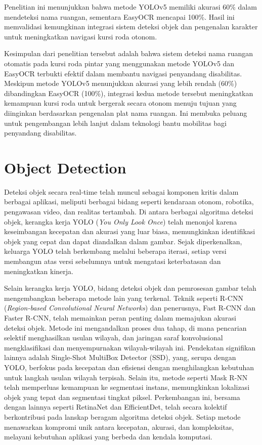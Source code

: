 Penelitian ini menunjukkan bahwa metode YOLOv5 memiliki akurasi 60\% dalam mendeteksi nama ruangan, sementara EasyOCR mencapai 100\%. Hasil ini memvalidasi kemungkinan integrasi sistem deteksi objek dan pengenalan karakter untuk meningkatkan navigasi kursi roda otonom.

Kesimpulan dari penelitian tersebut adalah bahwa sistem deteksi nama ruangan otomatis pada kursi roda pintar yang menggunakan metode YOLOv5 dan EasyOCR terbukti efektif dalam membantu navigasi penyandang disabilitas. Meskipun metode YOLOv5 menunjukkan akurasi yang lebih rendah (60\%) dibandingkan EasyOCR (100\%), integrasi kedua metode tersebut meningkatkan kemampuan kursi roda untuk bergerak secara otonom menuju tujuan yang diinginkan berdasarkan pengenalan plat nama ruangan. Ini membuka peluang untuk pengembangan lebih lanjut dalam teknologi bantu mobilitas bagi penyandang disabilitas.

\section{Object Detection}
Deteksi objek secara real-time telah muncul sebagai komponen kritis dalam berbagai aplikasi, meliputi berbagai bidang seperti kendaraan otonom, robotika, pengawasan video, dan realitas tertambah. Di antara berbagai algoritma deteksi objek, kerangka kerja YOLO (\emph{You Only Look Once}) telah menonjol karena keseimbangan kecepatan dan akurasi yang luar biasa, memungkinkan identifikasi objek yang cepat dan dapat diandalkan dalam gambar. Sejak diperkenalkan, keluarga YOLO telah berkembang melalui beberapa iterasi, setiap versi membangun atas versi sebelumnya untuk mengatasi keterbatasan dan meningkatkan kinerja.

Selain kerangka kerja YOLO, bidang deteksi objek dan pemrosesan gambar telah mengembangkan beberapa metode lain yang terkenal. Teknik seperti R-CNN (\emph{Region-based Convolutional Neural Networks}) dan penerusnya, Fast R-CNN dan Faster R-CNN, telah memainkan peran penting dalam memajukan akurasi deteksi objek. Metode ini mengandalkan proses dua tahap, di mana pencarian selektif menghasilkan usulan wilayah, dan jaringan saraf konvolusional mengklasifikasi dan menyempurnakan wilayah-wilayah ini. Pendekatan signifikan lainnya adalah Single-Shot MultiBox Detector (SSD), yang, serupa dengan YOLO, berfokus pada kecepatan dan efisiensi dengan menghilangkan kebutuhan untuk langkah usulan wilayah terpisah. Selain itu, metode seperti Mask R-NN telah memperluas kemampuan ke segmentasi instans, memungkinkan lokalizasi objek yang tepat dan segmentasi tingkat piksel. Perkembangan ini, bersama dengan lainnya seperti RetinaNet dan EfficientDet, telah secara kolektif berkontribusi pada lanskap beragam algoritma deteksi objek. Setiap metode menawarkan kompromi unik antara kecepatan, akurasi, dan kompleksitas, melayani kebutuhan aplikasi yang berbeda dan kendala komputasi.\parencite{Yolov8}

